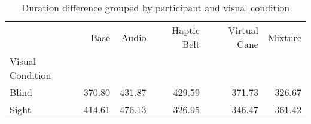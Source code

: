 
\begin{table}[!htb]
\centering
\caption{Duration difference grouped by participant and visual condition}
\label{tab:duracao_average_group}
\begin{tabular}{lrrrrr}
\toprule
{} &    Base &   Audio & Haptic Belt & Virtual Cane & Mixture \\
Visual Condition &         &         &             &              &         \\
\midrule
Blind            &  370.80 &  431.87 &      429.59 &       371.73 &  326.67 \\
Sight            &  414.61 &  476.13 &      326.95 &       346.47 &  361.42 \\
\bottomrule
\end{tabular}
\end{table}

